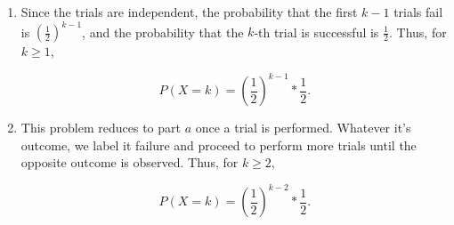 \begin{enumerate}[label=(\alph*)]

\item Since the trials are independent, the probability that the first $k-1$
trials fail is $(\frac{1}{2})^{k-1}$, and the probability that the 
$k$-th trial is successful is $\frac{1}{2}$. Thus, for $k \geq 1$,

$$P(X=k) = (\frac{1}{2})^{k-1}*\frac{1}{2}.$$

\item This problem reduces to part $a$ once a trial is performed. Whatever it's
outcome, we label it failure and proceed to perform more trials until the
opposite outcome is observed. Thus, for $k \geq 2$,

$$P(X=k) = (\frac{1}{2})^{k-2} * \frac{1}{2}.$$


\end{enumerate}